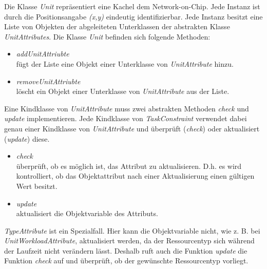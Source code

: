 Die Klasse \textit{Unit} repräsentiert eine Kachel dem Network-on-Chip. Jede Instanz ist durch die Positionsangabe \textit{(x,y)} eindeutig identifizierbar. Jede Instanz besitzt eine Liste von Objekten der abgeleiteten Unterklassen der abstrakten Klasse \textit{UnitAttributes}. Die Klasse \textit{Unit} befinden sich folgende Methoden:
\begin{itemize}
\item \textit{addUnitAttriubte}\\
fügt der Liste eine Objekt einer Unterklasse von \textit{UnitAttribute} hinzu.
\item \textit{removeUnitAttriubte}\\
löscht ein Objekt einer Unterklasse von \textit{UnitAttribute} aus der Liste.
\end{itemize}

Eine Kindklasse von \textit{UnitAttribute} muss zwei abstrakten Methoden \textit{check} und \textit{update} implementieren. Jede Kindklasse von \textit{TaskConstraint} verwendet dabei genau einer Kindklasse von \textit{UnitAttribute} und überprüft (\textit{check}) oder aktualisiert (\textit{update}) diese.

\begin{itemize}
\item \textit{check}\\
überprüft, ob es möglich ist, das Attribut zu aktualisieren. D.h. es wird kontrolliert, ob das Objektattribut nach einer Aktualisierung einen gültigen Wert besitzt.
\item \textit{update} \\
aktualisiert die Objektvariable des Attributs.
\end{itemize}


\textit{TypeAttribute} ist ein Spezialfall. Hier kann die Objektvariable nicht, wie z. B. bei \textit{UnitWorkloadAttribute}, aktualisiert werden, da der Ressourcentyp sich während der Laufzeit nicht verändern lässt. Deshalb ruft auch die Funktion \textit{update} die Funktion \textit{check} auf und überprüft, ob der gewünschte Ressourcentyp vorliegt.


